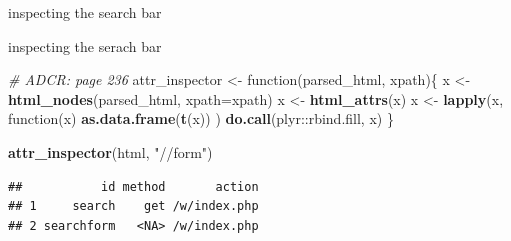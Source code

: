 \documentclass[ignorenonframetext,]{beamer}
\newenvironment{Shaded}{\begin{snugshade}}{\end{snugshade}}
\newcommand{\KeywordTok}[1]{\textcolor[rgb]{0.13,0.29,0.53}{\textbf{{#1}}}}
\newcommand{\DataTypeTok}[1]{\textcolor[rgb]{0.13,0.29,0.53}{{#1}}}
\newcommand{\StringTok}[1]{\textcolor[rgb]{0.31,0.60,0.02}{{#1}}}
\newcommand{\CommentTok}[1]{\textcolor[rgb]{0.56,0.35,0.01}{\textit{{#1}}}}
\newcommand{\NormalTok}[1]{{#1}}
\begin{document}
\begin{frame}[fragile]{inspecting the search bar}

\begin{Shaded}
\end{Shaded}

\end{frame}

\begin{frame}[fragile]{inspecting the serach bar}

\begin{Shaded}
\begin{Highlighting}[]
\CommentTok{# ADCR: page 236}
\NormalTok{attr_inspector <-}\StringTok{ }\NormalTok{function(parsed_html, xpath)\{}
  \NormalTok{x <-}\StringTok{ }\KeywordTok{html_nodes}\NormalTok{(parsed_html, }\DataTypeTok{xpath=}\NormalTok{xpath)}
  \NormalTok{x <-}\StringTok{ }\KeywordTok{html_attrs}\NormalTok{(x)}
  \NormalTok{x <-}\StringTok{ }\KeywordTok{lapply}\NormalTok{(x, function(x) }\KeywordTok{as.data.frame}\NormalTok{(}\KeywordTok{t}\NormalTok{(x)) )}
  \KeywordTok{do.call}\NormalTok{(plyr::rbind.fill, x)}
\NormalTok{\}}

\KeywordTok{attr_inspector}\NormalTok{(html, }\StringTok{"//form"}\NormalTok{)}
\end{Highlighting}
\end{Shaded}

\begin{verbatim}
##           id method       action
## 1     search    get /w/index.php
## 2 searchform   <NA> /w/index.php
\end{verbatim}

\end{frame}
\end{document}
